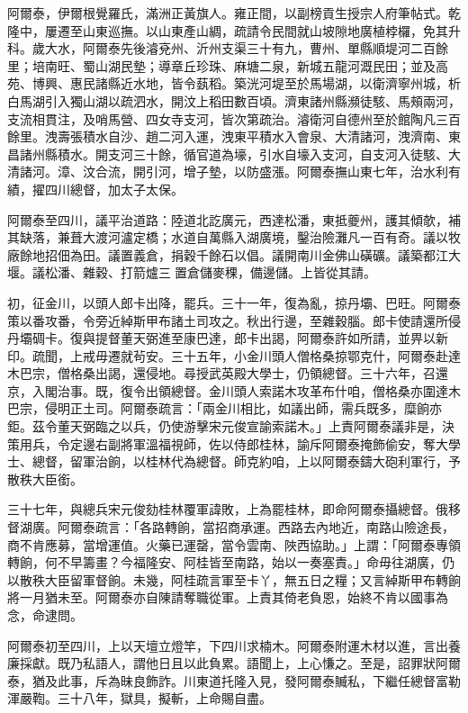 \begin{pinyinscope}
阿爾泰，伊爾根覺羅氏，滿洲正黃旗人。雍正間，以副榜貢生授宗人府筆帖式。乾隆中，屢遷至山東巡撫。以山東產山綢，疏請令民間就山坡隙地廣植桲欏，免其升科。歲大水，阿爾泰先後濬兗州、沂州支渠三十有九，曹州、單縣順堤河二百餘里；培南旺、蜀山湖民墊；導章丘珍珠、麻塘二泉，新城五龍河溉民田；並及高苑、博興、惠民諸縣近水地，皆令蓺稻。築洸河堤至於馬場湖，以衛濟寧州城，析白馬湖引入獨山湖以疏泗水，開汶上稻田數百頃。濟東諸州縣瀕徒駭、馬頰兩河，支流相貫注，及哨馬營、四女寺支河，皆次第疏治。濬衛河自德州至於館陶凡三百餘里。洩壽張積水自沙、趙二河入運，洩東平積水入會泉、大清諸河，洩濟南、東昌諸州縣積水。開支河三十餘，循官道為壕，引水自壕入支河，自支河入徒駭、大清諸河。漳、汶合流，開引河，增子墊，以防盛漲。阿爾泰撫山東七年，治水利有績，擢四川總督，加太子太保。

阿爾泰至四川，議平治道路：陸道北訖廣元，西達松潘，東抵夔州，護其傾欹，補其缺落，兼葺大渡河瀘定橋；水道自萬縣入湖廣境，鑿治險灘凡一百有奇。議以牧廠餘地招佃為田。議置義倉，捐穀千餘石以倡。議開南川金佛山磺礦。議築都江大堰。議松潘、雜穀、打箭爐三置倉儲麥稞，備邊儲。上皆從其請。

初，征金川，以頭人郎卡出降，罷兵。三十一年，復為亂，掠丹壩、巴旺。阿爾泰策以番攻番，令旁近綽斯甲布諸土司攻之。秋出行邊，至雜穀腦。郎卡使請還所侵丹壩碉卡。復與提督董天弼進至康巴達，郎卡出謁，阿爾泰許如所請，並畀以新印。疏聞，上戒毋遷就茍安。三十五年，小金川頭人僧格桑掠鄂克什，阿爾泰赴達木巴宗，僧格桑出謁，還侵地。尋授武英殿大學士，仍領總督。三十六年，召還京，入閣治事。既，復令出領總督。金川頭人索諾木攻革布什咱，僧格桑亦圍達木巴宗，侵明正土司。阿爾泰疏言：「兩金川相比，如議出師，需兵既多，糜餉亦鉅。茲令董天弼臨之以兵，仍使游擊宋元俊宣諭索諾木。」上責阿爾泰議非是，決策用兵，令定邊右副將軍溫福視師，佐以侍郎桂林，諭斥阿爾泰掩飾偷安，奪大學士、總督，留軍治餉，以桂林代為總督。師克約咱，上以阿爾泰鑄大砲利軍行，予散秩大臣銜。

三十七年，與總兵宋元俊劾桂林覆軍諱敗，上為罷桂林，即命阿爾泰攝總督。俄移督湖廣。阿爾泰疏言：「各路轉餉，當招商承運。西路去內地近，南路山險途長，商不肯應募，當增運值。火藥已運罄，當令雲南、陜西協助。」上謂：「阿爾泰專領轉餉，何不早籌畫？今福隆安、阿桂皆至南路，始以一奏塞責。」命毋往湖廣，仍以散秩大臣留軍督餉。未幾，阿桂疏言軍至卡丫，無五日之糧；又言綽斯甲布轉餉將一月猶未至。阿爾泰亦自陳請奪職從軍。上責其倚老負恩，始終不肯以國事為念，命逮問。

阿爾泰初至四川，上以天壇立燈竿，下四川求楠木。阿爾泰附運木材以進，言出養廉採獻。既乃私語人，謂他日且以此負累。語聞上，上心慊之。至是，詔罪狀阿爾泰，猶及此事，斥為昧良飾詐。川東道托隆入見，發阿爾泰贓私，下繼任總督富勒渾嚴鞫。三十八年，獄具，擬斬，上命賜自盡。


\end{pinyinscope}
